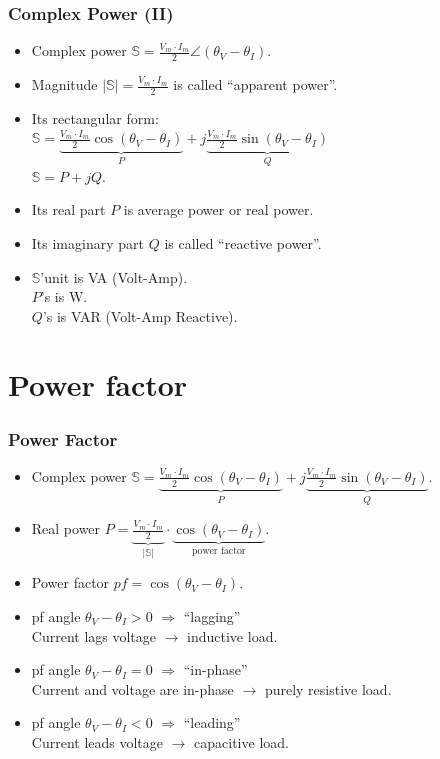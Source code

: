 \documentclass{beamer}
\begin{document}
\begin{frame}[fragile]
\frametitle{Complex Power (II)}

\begin{itemize}
\item Complex power $\mathbb{S} = \frac{V_m \cdot I_m}{2} \angle (\theta_V -\theta_I)$.
\item Magnitude $|\mathbb{S}| = \frac{V_m \cdot I_m}{2}$ is called ``apparent power''.
\item Its rectangular form:
\\
$\mathbb{S} = \underbrace{\frac{V_m \cdot I_m}{2} \cos(\theta_V - \theta_I)}_P + j \underbrace{\frac{V_m \cdot I_m}{2} \sin(\theta_V - \theta_I)}_Q$
\\
$\mathbb{S} = P +jQ$.
\item Its real part $P$ is average power or real power.
\item Its imaginary part $Q$ is called ``reactive power''.
\item $\mathbb{S}$'unit is VA (Volt-Amp).
\\
$P$'s is W.
\\
$Q$'s is VAR (Volt-Amp Reactive).
\end{itemize}

\end{frame}


\section{Power factor}

\begin{frame}[fragile]
\frametitle{Power Factor}

\begin{itemize}
\item Complex power $\mathbb{S} = \underbrace{\frac{V_m \cdot I_m}{2} \cos(\theta_V - \theta_I)}_P + j \underbrace{\frac{V_m \cdot I_m}{2} \sin(\theta_V - \theta_I)}_Q$.
\item Real power $P =   \underbrace{\frac{V_m \cdot I_m}{2}}_{|\mathbb{S}|} \cdot \underbrace{\cos(\theta_V - \theta_I)}_{\mbox{power factor}}$.
\item Power factor $pf = \cos(\theta_V - \theta_I)$.
\item pf angle $\theta_V - \theta_I > 0$ $\Rightarrow$ ``lagging''
\\
Current lags voltage $\rightarrow$ inductive load.
%
\item pf angle $\theta_V - \theta_I = 0$ $\Rightarrow$ ``in-phase''
\\
Current and voltage are in-phase $\rightarrow$ purely resistive load.
%
\item pf angle $\theta_V - \theta_I < 0$ $\Rightarrow$ ``leading''
\\
Current leads voltage $\rightarrow$ capacitive load.
\end{itemize}

\end{frame}
\end{document}
